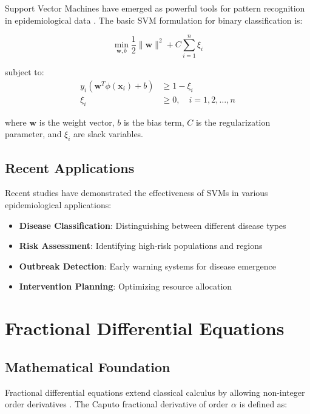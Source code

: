\documentclass[12pt,a4paper]{report}
\begin{document}
Support Vector Machines have emerged as powerful tools for pattern recognition in epidemiological data \autocite{cortes_vapnik_1995}. The basic SVM formulation for binary classification is:

\begin{equation}
\min_{\mathbf{w}, b} \frac{1}{2}\|\mathbf{w}\|^2 + C\sum_{i=1}^{n}\xi_i
\end{equation}

subject to:
\begin{align}
y_i(\mathbf{w}^T\phi(\mathbf{x}_i) + b) &\geq 1 - \xi_i \\
\xi_i &\geq 0, \quad i = 1, 2, \ldots, n
\end{align}

where $\mathbf{w}$ is the weight vector, $b$ is the bias term, $C$ is the regularization parameter, and $\xi_i$ are slack variables.

\subsection{Recent Applications}

Recent studies have demonstrated the effectiveness of SVMs in various epidemiological applications:

\begin{itemize}
    \item \textbf{Disease Classification}: Distinguishing between different disease types
    \item \textbf{Risk Assessment}: Identifying high-risk populations and regions
    \item \textbf{Outbreak Detection}: Early warning systems for disease emergence
    \item \textbf{Intervention Planning}: Optimizing resource allocation
\end{itemize}

\section{Fractional Differential Equations}

\subsection{Mathematical Foundation}

Fractional differential equations extend classical calculus by allowing non-integer order derivatives \autocite{caputo_1967}. The Caputo fractional derivative of order $\alpha$ is defined as:
\end{document}
